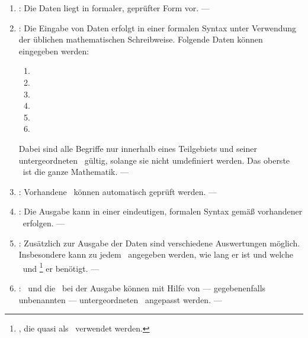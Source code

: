 %
\begin{enumerate}

	\item \label{Anforderung-Form} :
	Die Daten liegt in formaler, geprüfter Form vor.
	--- 

	\item \label{Anforderung-Eingaben} :
	Die Eingabe von Daten erfolgt in einer formalen Syntax unter Verwendung der üblichen mathematischen Schreibweise.
	Folgende Daten können eingegeben werden:
	\begin{enumerate}
		\item \Axiome
		\item \Saetze
		\item \Beweise
		\item \Fachbegriffe
		\item \Teilgebiete
		\item \Ausgabeschemata
	\end{enumerate}
	Dabei sind alle Begriffe nur innerhalb eines Teilgebiets und seiner untergeordneten \Teilgebiete\ gültig, solange sie nicht umdefiniert werden.
	Das oberste \Teilgebiet\ ist die ganze Mathematik.
	--- 

	\item \label{Anforderung-Pruefung} :
	Vorhandene \Beweise\ können automatisch geprüft werden.
	--- 

	\item \label{Anforderung-Ausgaben} :
	Die Ausgabe kann in einer eindeutigen, formalen Syntax gemäß vorhandener \Ausgabeschemata\ erfolgen.
	--- 

	\item \label{Anforderung-Auswertungen} :
	Zusätzlich zur Ausgabe der Daten sind verschiedene Auswertungen möglich.
	Insbesondere kann zu jedem \Beweis\ angegeben werden, wie lang er ist und welche \Axiome\ und \Saetze%
	\footnote{\Saetze, die quasi als \Axiome\ verwendet werden.}
	er benötigt.
	--- 

	\item \label{Anforderung-Anpassbarkeit} :
	\Fachbegriffe\ und die \Darstellung\ bei der Ausgabe können mit Hilfe von --- gegebenenfalls unbenannten --- untergeordneten \Teilgebieten\ angepasst werden.
	--- 


\end{enumerate}
